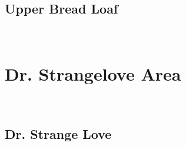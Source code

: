 \begin{multicols}{2}
\begin{minipage}{\columnwidth}
			\end{minipage}
			
			\begin{minipage}{\columnwidth}
			\subsection*{Upper Bread Loaf}\label{bf:Upper Bread Loaf}
			\
			
			\end{minipage}
			
\newpage
		\section{Dr. Strangelove Area}\label{sa:Dr. Strangelove Area}
	\begin{minipage}{\columnwidth}
	\
	\end{minipage}
	
			\begin{minipage}{\columnwidth}
			\subsection*{Dr. Strange Love}\label{bf:Dr. Strange Love}
			\
			
			\end{minipage}
			
\end{multicols}
\clearpage